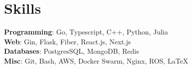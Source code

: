\section*{\sc Skills}
\vspace{-2mm}
\hrulefill
\vspace{1mm}

\textbf{Programming}: Go, Typescript, C++, Python, Julia \\
\textbf{Web}: Gin, Flask, Fiber, React.js, Next.js \\
\textbf{Databases}: PostgresSQL, MongoDB, Redis \\
\textbf{Misc}: Git, Bash, AWS, Docker Swarm, Nginx, ROS, \LaTeX \\
